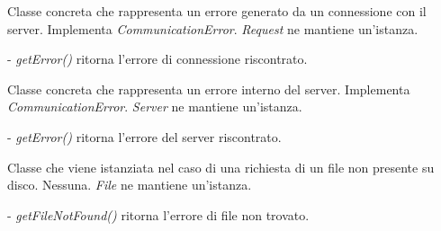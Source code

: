Classe concreta che rappresenta un errore generato da un connessione con il server.
Implementa \textit{CommunicationError}.
\textit{Request} ne mantiene un'istanza.
\begin{elencopuntato}[\subsubsecindent]
\item[-] \textit{getError()} ritorna l'errore di connessione riscontrato.
\end{elencopuntato}

Classe concreta che rappresenta un errore interno del server.
Implementa \textit{CommunicationError}.
\textit{Server} ne mantiene un'istanza.
\begin{elencopuntato}[\subsubsecindent]
\item[-] \textit{getError()} ritorna l'errore del server riscontrato.
\end{elencopuntato}


Classe che viene istanziata nel caso di una richiesta di un file non presente su disco.
Nessuna.
\textit{File} ne mantiene un'istanza.
\begin{elencopuntato}[\subsubsecindent]
\item[-] \textit{getFileNotFound()} ritorna l'errore di file non trovato.
\end{elencopuntato}




